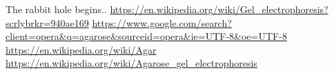 \documentclass[letterpaper]{article}
\begin{document}
The rabbit hole begins..
\url{https://en.wikipedia.org/wiki/Gel\_electrophoresis?scrlybrkr=940ae169}
\url{https://www.google.com/search?client=opera\&q=agarose\&sourceid=opera\&ie=UTF-8\&oe=UTF-8}
\url{https://en.wikipedia.org/wiki/Agar}
\url{https://en.wikipedia.org/wiki/Agarose\_gel\_electrophoresis}
\end{document}

